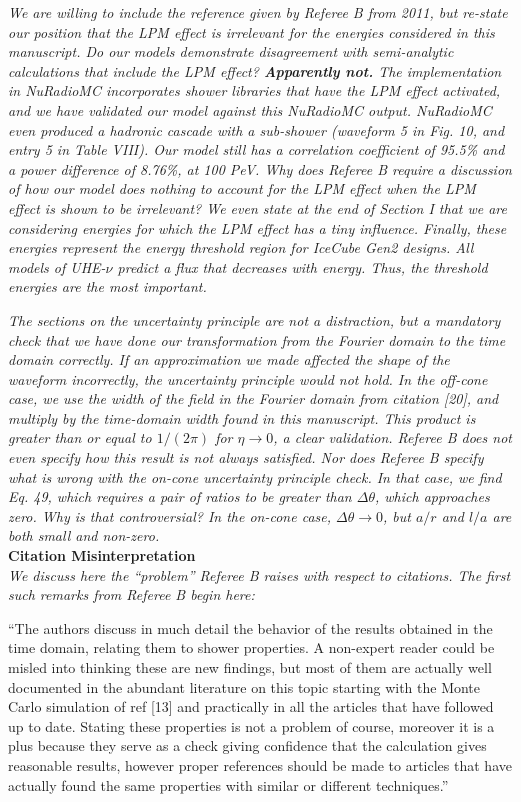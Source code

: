 \documentclass[12pt]{article}
\begin{document}
\textit{We are willing to include the reference given by Referee B from 2011, but re-state our position that the LPM effect is irrelevant for the energies considered in this manuscript.  Do our models demonstrate disagreement with semi-analytic calculations that include the LPM effect?  \textbf{Apparently not.}  The implementation in NuRadioMC incorporates shower libraries that have the LPM effect activated, and we have validated our model against this NuRadioMC output.  NuRadioMC even produced a hadronic cascade with a sub-shower (waveform 5 in Fig. 10, and entry 5 in Table VIII).  Our model still has a correlation coefficient of 95.5\% and a power difference of 8.76\%, at 100 PeV.  Why does Referee B require a discussion of how our model does nothing to account for the LPM effect when the LPM effect is shown to be irrelevant?  We even state at the end of Section I that we are considering energies for which the LPM effect has a tiny influence.  Finally, these energies represent the energy threshold region for IceCube Gen2 designs.  All models of UHE-$\nu$ predict a flux that decreases with energy.  Thus, the threshold energies are the most important.}

\textit{The sections on the uncertainty principle are not a distraction, but a mandatory check that we have done our transformation from the Fourier domain to the time domain correctly.  If an approximation we made affected the shape of the waveform incorrectly, the uncertainty principle would not hold.  In the off-cone case, we use the width of the field in the Fourier domain from citation [20], and multiply by the time-domain width found in this manuscript.  This product is greater than or equal to $1/(2\pi)$ for $\eta \to 0$, a clear validation.  Referee B does not even specify how this result is not always satisfied.  Nor does Referee B specify what is wrong with the on-cone uncertainty principle check.  In that case, we find Eq. 49, which requires a pair of ratios to be greater than $\Delta\theta$, which approaches zero.  Why is that controversial?  In the on-cone case, $\Delta\theta \to 0$, but $a/r$ and $l/a$ are both small and non-zero.} \\

\textbf{Citation Misinterpretation} \\

\textit{We discuss here the ``problem'' Referee B raises with respect to citations.  The first such remarks from Referee B begin here:}

``The authors discuss in much detail the behavior of the results obtained in the time domain, relating them to shower properties. A non-expert reader could be misled into thinking these are new findings, but most of them are actually well documented in the abundant literature on this topic starting with the Monte Carlo simulation of ref [13] and practically in all the articles that have followed up to date. Stating these properties is not a problem of course, moreover it is a plus because they serve as a check giving confidence that the calculation gives reasonable results, however proper references should be made to articles that have actually found the same properties with similar or different techniques.''
\end{document}
